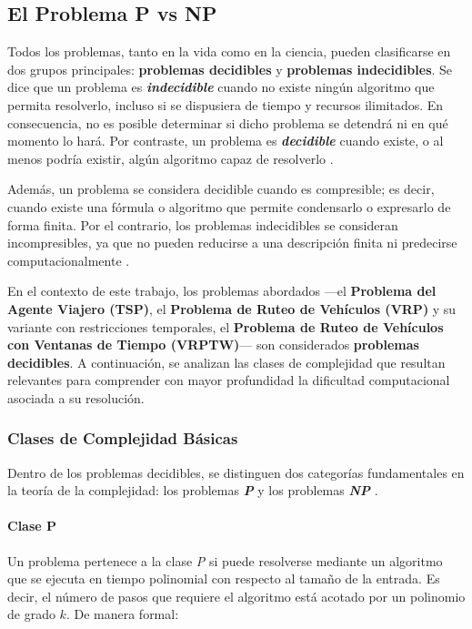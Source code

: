 \documentclass[12pt,titlepage,twoside,openright]{book}
\begin{document}
\subsection{El Problema P vs NP}

Todos los problemas, tanto en la vida como en la ciencia, pueden clasificarse en dos grupos principales: \textbf{problemas decidibles} y \textbf{problemas indecidibles}. Se dice que un problema es \textbf{\emph{indecidible}} cuando no existe ningún algoritmo que permita resolverlo, incluso si se dispusiera de tiempo y recursos ilimitados. En consecuencia, no es posible determinar si dicho problema se detendrá ni en qué momento lo hará. Por contraste, un problema es \textbf{\emph{decidible}} cuando existe, o al menos podría existir, algún algoritmo capaz de resolverlo \citep{maldonado2013problema}.

Además, un problema se considera decidible cuando es compresible; es decir, cuando existe una fórmula o algoritmo que permite condensarlo o expresarlo de forma finita. Por el contrario, los problemas indecidibles se consideran incompresibles, ya que no pueden reducirse a una descripción finita ni predecirse computacionalmente \citep{maldonado2013problema}.

En el contexto de este trabajo, los problemas abordados —el \textbf{Problema del Agente Viajero (TSP)}, el \textbf{Problema de Ruteo de Vehículos (VRP)} y su variante con restricciones temporales, el \textbf{Problema de Ruteo de Vehículos con Ventanas de Tiempo (VRPTW)}— son considerados \textbf{problemas decidibles}. A continuación, se analizan las clases de complejidad que resultan relevantes para comprender con mayor profundidad la dificultad computacional asociada a su resolución.

\subsubsection{Clases de Complejidad Básicas}

Dentro de los problemas decidibles, se distinguen dos categorías fundamentales en la teoría de la complejidad: los problemas \textbf{\emph{P}} y los problemas \textbf{\emph{NP}} \citep{maldonado2013problema}.

\paragraph{Clase P}

Un problema pertenece a la clase \emph{P} si puede resolverse mediante un algoritmo que se ejecuta en tiempo polinomial con respecto al tamaño de la entrada. Es decir, el número de pasos que requiere el algoritmo está acotado por un polinomio de grado \(k\). De manera formal:
\end{document}
